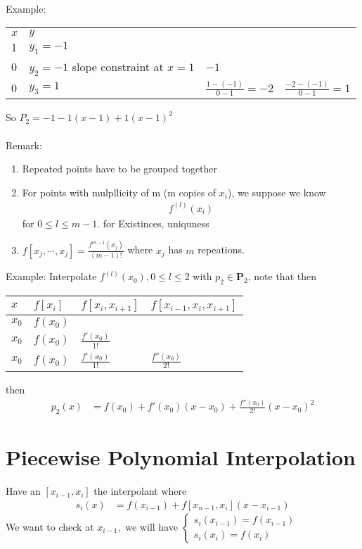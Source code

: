 \documentclass[11pt,oneside]{book}
\theoremstyle{break}
\theoremstyle{break}
\newcommand{\remark}{\color{blue}Remark: \color{black}}
\newcommand{\example}{\color{purple}Example: \color{black}}
\begin{document}
\example \begin{center}

\begin{tabular}{|l|l|l|l|}
\hline
$x$ &$y$\\
$1$ & $y_1=-1$ &  &  \\ \hline
$0$ & $y_2=-1$  slope constraint at $x=1$& $-1$ &  \\ \hline
$0$ & $y_3=1$ & $\frac{1-(-1)}{0-1}=-2$ & $\frac{-2-(-1)}{0-1}=1$ \\ \hline
\end{tabular}
\end{center}
So $P_2=-1-1(x-1)+1(x-1)^2$\\
\hfill\\
\remark \begin{enumerate}
\item Repeated points have to be grouped together
\item For points with mulpllicity of m (m copies of $x_i$), we suppose we know \begin{align*}
f^{(l)}(x_i)
\end{align*}
for $0\leq l\leq m-1$. for Existinces, uniquness
\item $f[x_j,\cdots,x_j]=\frac{f^{m-1}(x_j)}{(m-1)!}$ where $x_j$  has $m$ repeations.
\end{enumerate}
\example Interpolate $f^{(l)}(x_0),0\leq l\leq 2$ with $p_2\in \mathbf{P}_2$, note that
 then \begin{center}
\begin{tabular}{|l|l|l|l|}
\hline
$x$ & $f[x_i]$ & $f[x_i,x_{i+1}]$  & $f[x_{i-1},x_i,x_{i+1}]$  \\ \hline
$x_0$ & $f(x_0)$ &  &  \\ \hline
$x_0$ & $f(x_0)$ & $\frac{f'(x_0)}{1!}$  &  \\ \hline
$x_0$ & $f(x_0)$ & $\frac{f'(x_0)}{1!}$  & $\frac{f''(x_0)}{2!}$  \\ \hline
\end{tabular}
\end{center}
 then \begin{align*}
p_2(x)&=f(x_0)+f'(x_0)(x-x_0)+\frac{f''(x_0)}{2!}(x-x_0)^2
\end{align*}
\section[Piecewise Polynomial Interpolation]{Piecewise Polynomial Interpolation}
Have an $[x_{i-1},x_i]$ the interpolant where \begin{align*}
s_i(x)&=f(x_{i-1})+f[x_{n-1},x_i](x-x_{i-1})
\end{align*}
We want to check at $x_{i-1},$ we will have $\begin{cases}
s_i(x_{i-1})=f(x_{i-1})\\
s_i(x_i)=f(x_i)
\end{cases}
$\\
\hfill\\
\end{document}
